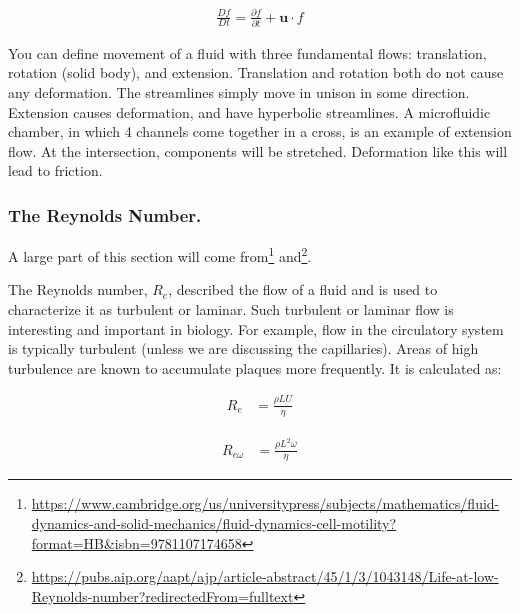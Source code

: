 \begin{equation} \label{LtoE}
\begin{split}
\frac{Df}{Dt} = \frac{\partial f}{\partial t} + \mathbf{u}\cdot f
\end{split}
\end{equation}

You can define movement of a fluid with three fundamental flows: translation, rotation (solid body), and extension. Translation and rotation both do not cause any deformation. The streamlines simply move in unison in some direction. Extension causes deformation, and have hyperbolic streamlines. A microfluidic chamber, in which 4 channels come together in a cross, is an example of extension flow. At the intersection, components will be stretched. Deformation like this will lead to friction.\newline

\subsubsection{The Reynolds Number.}

A large part of this section will come from\footnote{\url{https://www.cambridge.org/us/universitypress/subjects/mathematics/fluid-dynamics-and-solid-mechanics/fluid-dynamics-cell-motility?format=HB&isbn=9781107174658}} and\footnote{\url{https://pubs.aip.org/aapt/ajp/article-abstract/45/1/3/1043148/Life-at-low-Reynolds-number?redirectedFrom=fulltext}}.\newline

The Reynolds number, $R_e$, described the flow of a fluid and is used to characterize it as turbulent or laminar. Such turbulent or laminar flow is interesting and important in biology. For example, flow in the circulatory system is typically turbulent (unless we are discussing the capillaries). Areas of high turbulence are known to accumulate plaques more frequently. It is calculated as: 

\nopagebreak

\begin{equation} \label{Redefinition}
\begin{split}
R_e & = \frac{\rho LU}{\eta}
\end{split}
\end{equation}

\begin{equation} \label{Redefinition2}
\begin{split}
R_{e\omega} & = \frac{\rho L^2\omega}{\eta}
\end{split}
\end{equation}

